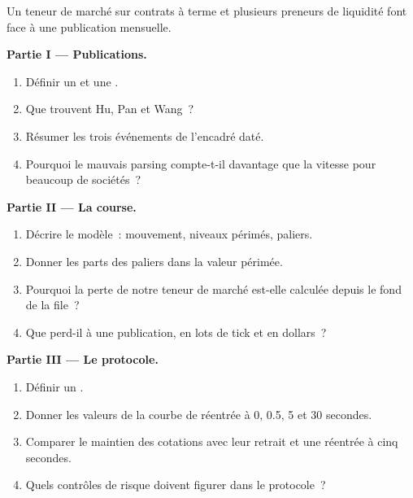 \begin{problem}\label{pb:hf:news-and-event-trading:1}
Un teneur de marché sur contrats à terme et plusieurs preneurs de liquidité font face à une publication mensuelle.

\medskip\noindent\textbf{Partie I --- Publications.}
\begin{enumerate}
\item Définir un  et une .
\item Que trouvent Hu, Pan et Wang~?
\item Résumer les trois événements de l'encadré daté.
\item Pourquoi le mauvais parsing compte-t-il davantage que la vitesse pour beaucoup de sociétés~?
\end{enumerate}

\medskip\noindent\textbf{Partie II --- La course.}
\begin{enumerate}[resume]
\item Décrire le modèle~: mouvement, niveaux périmés, paliers.
\item Donner les parts des paliers dans la valeur périmée.
\item Pourquoi la perte de notre teneur de marché est-elle calculée depuis le fond de la file~?
\item Que perd-il à une publication, en lots de tick et en dollars~?
\end{enumerate}

\medskip\noindent\textbf{Partie III --- Le protocole.}
\begin{enumerate}[resume]
\item Définir un .
\item Donner les valeurs de la courbe de réentrée à 0, 0.5, 5 et 30 secondes.
\item Comparer le maintien des cotations avec leur retrait et une réentrée à cinq secondes.
\item Quels contrôles de risque doivent figurer dans le protocole~?
\end{enumerate}


\end{problem}

